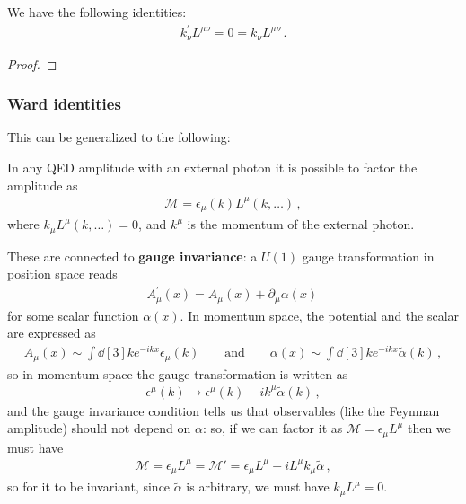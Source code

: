 \documentclass[main.tex]{subfiles}
\begin{document}
\begin{claim}
We have the following identities: 
%
\begin{align}
k^{\prime }_{\nu } L^{\mu \nu } = 0 = k_\nu L^{\mu \nu }
\,.
\end{align}
\end{claim}

\begin{proof}
\end{proof}

\subsubsection{Ward identities}

This can be generalized to the following: 
\begin{claim}
In any QED amplitude with an external photon it is possible to factor the amplitude as 
%
\begin{align}
\mathcal{M} = \epsilon_{\mu } (k) L^{\mu } (k, \dots)
\,,
\end{align}
%
where \(k_\mu L^{\mu } (k, \dots) = 0\), and \(k^{\mu }\) is the momentum of the external photon.
\end{claim}

These are connected to \textbf{gauge invariance}: a \(U(1)\) gauge transformation in position space reads 
%
\begin{align}
A^{\prime }_{\mu } (x) = A_{\mu } (x) + \partial_{\mu} \alpha (x)
\,
\end{align}
%
for some scalar function \(\alpha (x)\). In momentum space, the potential and the scalar are expressed as 
%
\begin{align}
A_{\mu } (x) \sim \int \dd[3]{k} e^{-ikx} \epsilon_{\mu } (k) 
\qquad \text{and} \qquad
\alpha (x) \sim \int \dd[3]{k} e^{-ikx} \widetilde{\alpha}(k)
\,,
\end{align}
%
so in momentum space the gauge transformation is written as 
%
\begin{align}
\epsilon^{\mu }(k) \to \epsilon^{\mu }(k) - i k^{\mu } \widetilde{\alpha} (k)
\,,
\end{align}
%
and the gauge invariance condition tells us that observables (like the Feynman amplitude) should not depend on \(\alpha\): so, if we can factor it as \(\mathcal{M} = \epsilon_{\mu } L^{\mu }\) then we must have 
%
\begin{align}
\mathcal{M} = \epsilon_{\mu } L^{\mu }
= \mathcal{M}' = \epsilon_{\mu } L^{\mu } - i L^{\mu } k_{\mu } \widetilde{\alpha}
\,,
\end{align}
%
so for it to be invariant, since \(\widetilde{\alpha} \) is arbitrary, we must have \(k_{\mu } L^{\mu } = 0\).
\end{document}
